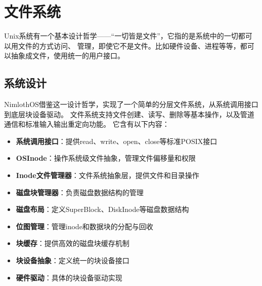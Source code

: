 \chapter{文件系统}

Unix系统有一个基本设计哲学——“一切皆是文件”，它指的是系统中的一切都可以用文件的方式访问、
管理，即使它不是文件。比如硬件设备、进程等等，都可以抽象成文件，使用统一的用户接口。

\section{系统设计}

NimlothOS借鉴这一设计哲学，实现了一个简单的分层文件系统，从系统调用接口到底层块设备驱动。
文件系统支持文件创建、读写、删除等基本操作，以及管道通信和标准输入输出重定向功能。
它含有以下内容：

\begin{itemize}
    \item \textbf{系统调用接口}：提供read、write、open、close等标准POSIX接口
    \item \textbf{OSInode}：操作系统级文件抽象，管理文件偏移量和权限
    \item \textbf{Inode文件管理器}：文件系统抽象层，提供文件和目录操作
    \item \textbf{磁盘块管理器}：负责磁盘数据结构的管理
    \item \textbf{磁盘布局}：定义SuperBlock、DiskInode等磁盘数据结构
    \item \textbf{位图管理}：管理inode和数据块的分配与回收
    \item \textbf{块缓存}：提供高效的磁盘块缓存机制
    \item \textbf{块设备抽象}：定义统一的块设备接口
    \item \textbf{硬件驱动}：具体的块设备驱动实现
\end{itemize}

